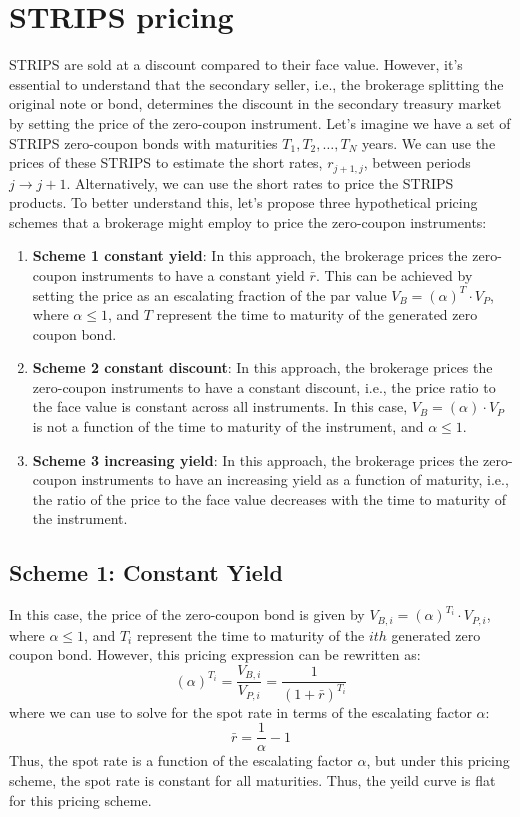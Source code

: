\documentclass[11pt]{article}
\theoremstyle{definition}
\begin{document}
\section*{STRIPS pricing}
STRIPS are sold at a discount compared to their face value. However, it's essential to understand that the secondary seller, i.e., the brokerage splitting the original note or bond, determines the discount in the secondary treasury market by setting the price of the zero-coupon instrument. Let's imagine we have a set of STRIPS zero-coupon bonds with maturities $T_{1}, T_{2},\ldots, T_{N}$ years. 
We can use the prices of these STRIPS to estimate the short rates, $r_{j+1,j}$, between periods $j\rightarrow{j+1}$.
Alternatively, we can use the short rates to price the STRIPS products. 
To better understand this, let's propose three hypothetical pricing schemes that a brokerage might employ to price the zero-coupon instruments:
\begin{enumerate}
\item{\textbf{Scheme 1 constant yield}: In this approach, the brokerage prices the zero-coupon instruments to have a constant yield $\bar{r}$. This can be achieved by setting the price as an escalating fraction of the par value $V_{B} = \left(\alpha\right)^{T}\cdot{V}_{P}$, where $\alpha\leq{1}$, and $T$ represent the time to maturity of the generated zero coupon bond.}
\item{\textbf{Scheme 2 constant discount}: In this approach, the brokerage prices the zero-coupon instruments to have a constant discount, i.e., the price ratio to the face value is constant across all instruments. In this case, $V_{B} = \left(\alpha\right)\cdot{V}_{P}$ is not a function of the time to maturity of the instrument, and $\alpha\leq{1}$.}
\item{\textbf{Scheme 3 increasing yield}: In this approach, the brokerage prices the zero-coupon instruments to have an increasing yield as a function of maturity, i.e., the ratio of the price to the face value decreases with the time to maturity of the instrument.}
\end{enumerate}

\subsection*{Scheme 1: Constant Yield}
In this case, the price of the zero-coupon bond is given by $V_{B, i} = \left(\alpha\right)^{T_{i}}\cdot{V}_{P, i}$, where $\alpha\leq{1}$, and $T_{i}$ represent the time to maturity of the $ith$ generated zero coupon bond. However, this pricing expression can be rewritten as:
\begin{equation}
\left(\alpha\right)^{T_{i}} = \frac{V_{B,i}}{V_{P,i}} = \frac{1}{\left(1+\bar{r}\right)^{T_{i}}}
\end{equation}
where we can use to solve for the spot rate in terms of the escalating factor $\alpha$:
\begin{equation}
\bar{r} = \frac{1}{\alpha} - 1
\end{equation}
Thus, the spot rate is a function of the escalating factor $\alpha$, but under this pricing scheme, 
the spot rate is constant for all maturities. Thus, the yeild curve is flat for this pricing scheme.
\end{document}
